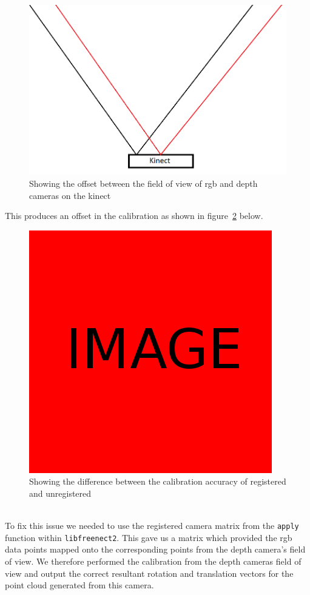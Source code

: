 \documentclass{article}
\begin{document}
\begin{figure}[h]
  \centering
  \includegraphics[scale=0.7]{rgbdepth}
  \caption{Showing the offset between the field of view of rgb and depth cameras on the kinect}
  \label{fig:rgbdepth}
\end{figure}
This produces an offset in the calibration as shown in figure~\ref{fig:calibrationoffset} below.
\\
\begin{figure}[h]
  \centering
  \includegraphics[scale=0.3]{placeholder}
  \caption{Showing the difference between the calibration accuracy of registered and unregistered}
  \label{fig:calibrationoffset}
\end{figure}
\\
To fix this issue we needed to use the registered camera matrix from the \texttt{apply} function within \texttt{libfreenect2}. This gave us a matrix which provided the rgb data points mapped onto the corresponding points from the depth camera's field of view. We therefore performed the calibration from the depth cameras field of view and output the correct resultant rotation and translation vectors for the point cloud generated from this camera.
\newpage
\end{document}
